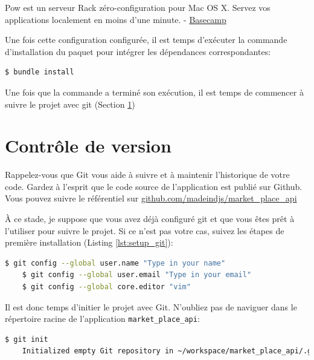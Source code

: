 \documentclass[]{report}
\begin{document}
        \begin{displayquote}
          Pow est un serveur Rack zéro-configuration pour Mac OS X. Servez vos applications localement en moins d'une minute. - \href{https://basecamp.com/}{Basecamp}
        \end{displayquote}

        Une fois cette configuration configurée, il est temps d'exécuter la commande d'installation du paquet pour intégrer les dépendances correspondantes:

        \begin{scriptsize}
        \begin{lstlisting}[language=bash]
        $ bundle install
        \end{lstlisting}
        \end{scriptsize}

        Une fois que la commande a terminé son exécution, il est temps de commencer à suivre le projet avec git (Section \ref{section:git})

  \section{Contrôle de version}\label{section:git}

    Rappelez-vous que Git vous aide à suivre et à maintenir l'historique de votre code. Gardez à l'esprit que le code source de l'application est publié sur Github. Vous pouvez suivre le référentiel sur \href{https://github.com/madeindjs/market_place_api}{github.com/madeindjs/market\_place\_api}

    À ce stade, je suppose que vous avez déjà configuré git et que vous êtes prêt à l'utiliser pour suivre le projet. Si ce n'est pas votre cas, suivez les étapes de première installation (Listing \ref{lst:setup_git}):

    \begin{scriptsize}
    \begin{lstlisting}[language=bash, label={lst:setup_git}]
    $ git config --global user.name "Type in your name"
    $ git config --global user.email "Type in your email"
    $ git config --global core.editor "vim"
    \end{lstlisting}
    \end{scriptsize}

    Il est donc temps d'initier le projet avec Git. N'oubliez pas de naviguer dans le répertoire racine de l'application \verb|market_place_api|:

    \begin{scriptsize}
    \begin{lstlisting}[language=bash]
    $ git init
    Initialized empty Git repository in ~/workspace/market_place_api/.git/
    \end{lstlisting}
    \end{scriptsize}
\end{document}
